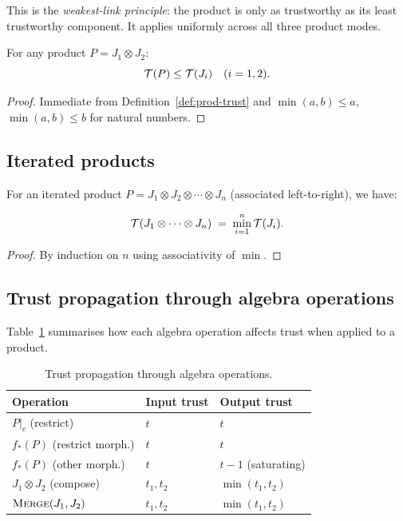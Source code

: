 \documentclass[11pt]{article}
\newcommand{\Jprod}{\mathbin{\otimes}}            %
\newcommand{\JprodN}[2]{#1 \Jprod #2}             %
\begin{document}
This is the \emph{weakest-link principle}: the product is only as
trustworthy as its least trustworthy component.  It applies uniformly
across all three product modes.

\begin{proposition}\label{prop:trust-bounds}
For any product $P = \JprodN{J_1}{J_2}$:
\[
  \mathcal{T}(P) \leq \mathcal{T}(J_i) \quad (i = 1, 2).
\]
\end{proposition}
\begin{proof}
Immediate from Definition~\ref{def:prod-trust} and $\min(a,b) \leq a$,
$\min(a,b) \leq b$ for natural numbers.
\end{proof}

\subsection{Iterated products}

For an iterated product $P = J_1 \Jprod J_2 \Jprod \cdots \Jprod J_n$
(associated left-to-right), we have:

\begin{corollary}\label{cor:iterated-trust}
\[
  \trust(J_1 \Jprod \cdots \Jprod J_n)
  \;=\; \min_{i=1}^{n} \trust(J_i).
\]
\end{corollary}
\begin{proof}
By induction on $n$ using associativity of $\min$.
\end{proof}

\subsection{Trust propagation through algebra operations}

Table~\ref{tab:trust-ops} summarises how each algebra operation affects
trust when applied to a product.

\begin{table}[h]
\centering
\caption{Trust propagation through algebra operations.}
\label{tab:trust-ops}
\begin{tabular}{lll}
\toprule
\textbf{Operation} & \textbf{Input trust} & \textbf{Output trust} \\
\midrule
$P|_c$ (restrict)        & $t$       & $t$ \\
$f_*(P)$ (restrict morph.)& $t$      & $t$ \\
$f_*(P)$ (other morph.)  & $t$       & $t - 1$ (saturating) \\
$\JprodN{J_1}{J_2}$ (compose) & $t_1, t_2$ & $\min(t_1, t_2)$ \\
$\textsc{Merge}(J_1, J_2)$ & $t_1, t_2$ & $\min(t_1, t_2)$ \\
\bottomrule
\end{tabular}
\end{table}
\end{document}
